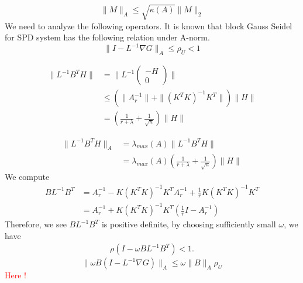 \begin{itemize}
\begin{equation}
    \|M \|_A \leq \sqrt{ \kappa(A)} \| M \|_2
\end{equation}
We need to analyze the following operators. 
It is known that block Gauss Seidel for SPD system has the following relation under A-norm.
\begin{equation}
    \| I - L^{-1} \nabla G \|_A \leq \rho_U < 1 
\end{equation}


\begin{equation}
\begin{aligned}
   \| L^{-1} B^T H \| & = \| L^{-1}  \begin{pmatrix}
   -H \\
   0
   \end{pmatrix}\|  \\
   & \leq \left(\|A_r^{-1}\| +\| (K^T K)^{-1}K^T \|\right) \|H\| \\
   & = (\frac{1}{r + \lambda } + \frac{1}{\sqrt{n}} ) \|H\| 
\end{aligned}
\end{equation}


\begin{equation}
\begin{aligned}
   \| L^{-1} B^T H \|_A & = \lambda_{max}(A) \| L^{-1} B^T H\| \\
   & =\lambda_{max}(A) (\frac{1}{r + \lambda } + \frac{1}{\sqrt{n}} ) \|H\| 
\end{aligned}
\end{equation}
We compute 
\begin{equation}
\begin{aligned}
       BL^{-1}B^T & = A_r^{-1} - K (K^T K)^{-1} K^T A_r^{-1} + \frac{1}{r}K (K^T K)^{-1}K^T \\
       & = A_r^{-1} + K (K^T K)^{-1} K^T (\frac{1}{r} I - A_r^{-1})
\end{aligned}
\end{equation}
Therefore, we see $BL^{-1} B^T$ is positive definite, by choosing sufficiently small $\omega$, we have
\begin{equation}
\begin{aligned}
   \rho ( I - \omega B L^{-1} B^T ) < 1 .
\end{aligned}
\end{equation}
\begin{equation}
     \| \omega B (I - L^{-1} \nabla G) \|_A \leq \omega \|B \|_A \rho_U
\end{equation}
\textcolor{red}{ Here !} 


\end{itemize}
